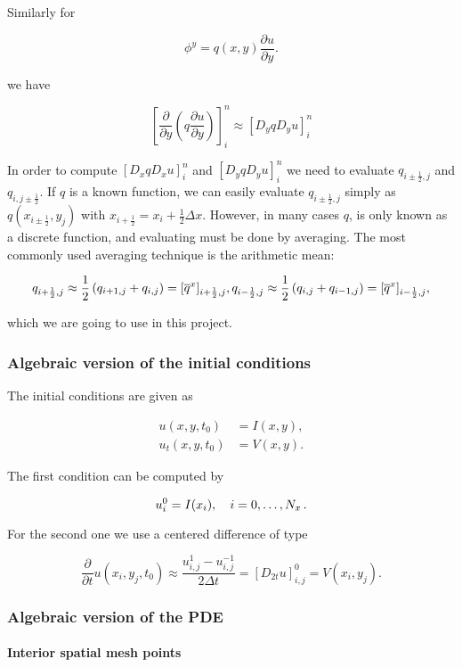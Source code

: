 \documentclass[letterpaper,10pt,english]{/usr/share/sphinx/texinputs/sphinxhowto}
\begin{document}
Similarly for

\[
\phi^y = q(x,y)
\frac{\partial u}{\partial y}.
\]

we have

\[
\left[
     \frac{\partial}{\partial y}\left( q
     \frac{\partial u}{\partial y}\right)\right]^n_i
     \approx [D_yq D_y u]^n_i
\]

In order to compute $[D_xq D_x u]^n_i$ and $[D_yq D_y u]^n_i$ we need to
evaluate $q_{i\pm\frac{1}{2},j}$ and $q_{i,j\pm\frac{1}{2}}$. If $q$ is
a known function, we can easily evaluate $q_{i\pm\frac{1}{2},j}$ simply
as $q(x_{i\pm\frac{1}{2}},y_j)$ with
$x_{i+\frac{1}{2}} = x_i + \frac{1}{2}\Delta x$. However, in many cases
$q$, is only known as a discrete function, and evaluating must be done
by averaging. The most commonly used averaging technique is the
arithmetic mean:

\[
q_{i+\frac{1}{2},j} \approx
     \frac{1}{2}\left(q_{i+1,j}+ q_{i,j}\right) =
     [\overline{q}^{x}]_{i+\frac{1}{2},j},\\
q_{i-\frac{1}{2},j} \approx
     \frac{1}{2}\left(q_{i,j}+ q_{i-1,j}\right) =
     [\overline{q}^{x}]_{i-\frac{1}{2},j},  
\]

which we are going to use in this project.\subsubsection{Algebraic version of the initial conditions}

The initial conditions are given as

\begin{align*}
u(x,y,t_0)&=I(x,y),\\
u_t(x,y,t_0)&=V(x,y).
\end{align*}

The first condition can be computed by

\[
u_i^0 = I(x_i),\quad i=0,\ldots,N_x{\thinspace .}
\]

For the second one we use a centered difference of type

\[
\frac{\partial}{\partial t} u(x_i,y_j,t_0)\approx
\frac{u^1_{i,j} - u^{-1}_{i,j}}{2\Delta t} = [D_{2t} u]^0_{i,j} = V(x_i,y_j).
\]\subsubsection{Algebraic version of the PDE}

\paragraph{Interior spatial mesh points}
\end{document}
